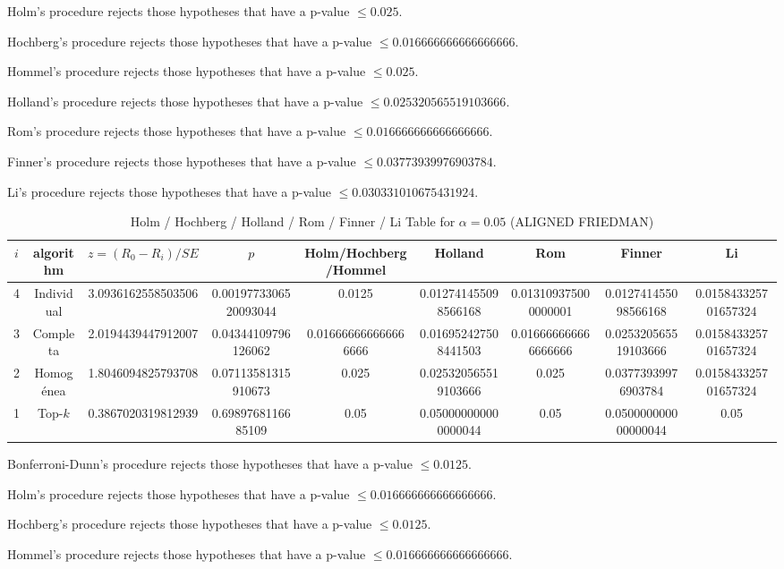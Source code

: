\documentclass[a4paper,10pt]{article}
\begin{document}
\begin{landscape}
Holm's procedure rejects those hypotheses that have a p-value $\le0.025$.


Hochberg's procedure rejects those hypotheses that have a p-value $\le0.016666666666666666$.


Hommel's procedure rejects those hypotheses that have a p-value $\le0.025$.


Holland's procedure rejects those hypotheses that have a p-value $\le0.025320565519103666$.


Rom's procedure rejects those hypotheses that have a p-value $\le0.016666666666666666$.


Finner's procedure rejects those hypotheses that have a p-value $\le0.03773939976903784$.


Li's procedure rejects those hypotheses that have a p-value $\le0.030331010675431924$.



\newpage

\begin{table}[!htp]
\centering\scriptsize
\caption{Holm / Hochberg / Holland / Rom / Finner / Li Table for $\alpha=0.05$ (ALIGNED FRIEDMAN)}
\begin{tabular}{ccccccccc}
$i$&algorithm&$z=(R_0 - R_i)/SE$&$p$&Holm/Hochberg/Hommel&Holland&Rom&Finner&Li\\
\hline
4&Individual&3.0936162558503506&0.0019773306520093044&0.0125&0.012741455098566168&0.013109375000000001&0.012741455098566168&0.015843325701657324\\
3&Completa&2.0194439447912007&0.04344109796126062&0.016666666666666666&0.016952427508441503&0.016666666666666666&0.025320565519103666&0.015843325701657324\\
2&Homogénea&1.8046094825793708&0.07113581315910673&0.025&0.025320565519103666&0.025&0.03773939976903784&0.015843325701657324\\
1&Top-$k$&0.3867020319812939&0.6989768116685109&0.05&0.050000000000000044&0.05&0.050000000000000044&0.05\\
\hline
\end{tabular}
\end{table}
Bonferroni-Dunn's procedure rejects those hypotheses that have a p-value $\le0.0125$.


Holm's procedure rejects those hypotheses that have a p-value $\le0.016666666666666666$.


Hochberg's procedure rejects those hypotheses that have a p-value $\le0.0125$.


Hommel's procedure rejects those hypotheses that have a p-value $\le0.016666666666666666$.



\end{landscape}
\end{document}
